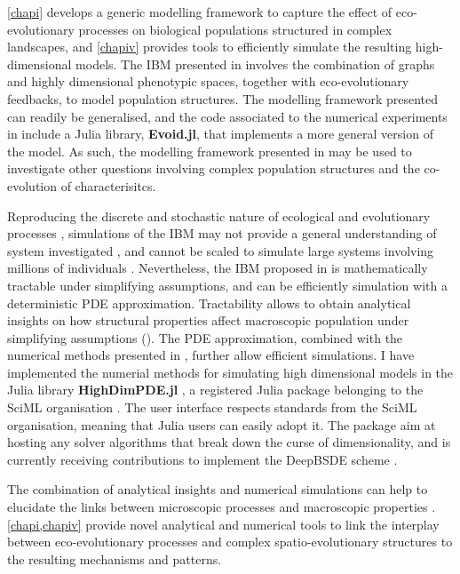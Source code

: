 \cref{chapi} develops a generic modelling framework to capture the effect of eco-evolutionary processes on biological populations structured in complex landscapes, and \cref{chapiv} provides tools to efficiently simulate the resulting high-dimensional models.
% 
The IBM presented in \chapi involves the combination of graphs and highly dimensional phenotypic spaces, together with eco-evolutionary feedbacks, to model population structures. The modelling framework presented can readily be generalised, and the code associated to the numerical experiments in \chapi include a Julia library, \textbf{Evoid.jl}, that implements a more general version of the model. %
% 
As such, the modelling framework presented in \chapi may be used to investigate other questions involving complex population structures and the co-evolution of characterisitcs.

% 
Reproducing the discrete and stochastic nature of ecological and evolutionary processes \citep{Champagnat2006}, simulations of the IBM may not provide a general understanding of system investigated \xxx, and cannot be scaled to simulate large systems involving millions of individuals \xxx. Nevertheless, the IBM proposed in \chapi is mathematically tractable under simplifying assumptions, and can be efficiently simulation with a deterministic PDE approximation.
% 
Tractability allows to obtain analytical insights on how structural properties affect macroscopic population under simplifying assumptions (\chapi).
% 
The PDE approximation, combined with the numerical methods presented in \chapiv, further allow efficient simulations. 
% 
I have implemented the numerial methods for simulating high dimensional models in the Julia library \textbf{HighDimPDE.jl} \citep{HighDimPDE}, a registered Julia package belonging to the SciML organisation \citep{XXX}.
The user interface respects standards from the SciML organisation, meaning that Julia users can easily adopt it.
%
The package aim at hosting any solver algorithms that break down the curse of dimensionality, and is currently receiving contributions to implement the DeepBSDE scheme \citep{Han2018}.

The combination of analytical insights and numerical simulations can help to elucidate the links between microscopic processes and macroscopic properties \citep{Levin}.
% 
\cref{chapi,chapiv} provide novel analytical and numerical tools to link the interplay between eco-evolutionary processes and complex spatio-evolutionary structures to the resulting mechanisms and patterns.


